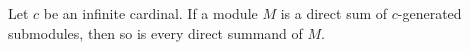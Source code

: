 Let $c$ be an infinite cardinal. If a module $M$ is a direct sum of $c$-generated submodules, then so is every direct summand of $M$.
